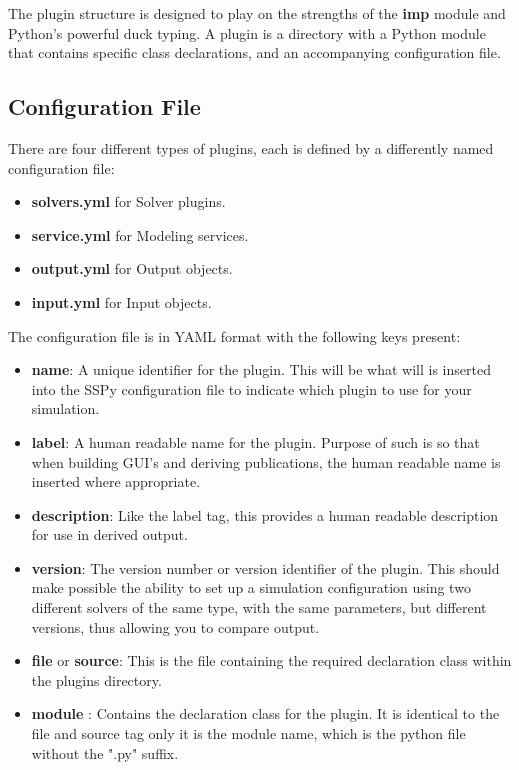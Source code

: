 \documentclass[12pt]{article}
\begin{document}
The plugin structure is designed to play on the strengths of the {\bf imp} module and Python's powerful duck typing. A plugin is a directory with a Python module that contains specific class declarations, and an accompanying configuration file. 

\subsection*{Configuration File}

There are four different types of plugins, each is defined by a differently named configuration file:

\begin{itemize}
	\item[] {\bf solvers.yml} for Solver plugins.
	\item[] {\bf service.yml} for Modeling services.
	\item[] {\bf output.yml} for Output objects.
	\item[] {\bf input.yml} for Input objects.
\end{itemize}

The configuration file is in YAML format with the following keys present:

\begin{itemize}
	\item[] {\bf name}: A unique identifier for the plugin. This will be what will is inserted into the SSPy configuration file to indicate which plugin to use for your simulation.
	\item[] {\bf label}: A human readable name for the plugin. Purpose of such is so that when building GUI's and deriving publications, the human readable name is inserted where appropriate. 
	\item[] {\bf description}: Like the label tag, this provides a human readable description for use in derived output.
	\item[] {\bf version}: The version number or version identifier of the plugin. This should make possible the ability to set up a simulation configuration using two different solvers of the same type, with the same parameters, but different versions, thus allowing you to compare output.
	\item[] {\bf file} or {\bf source}: This is the file containing the required declaration class within the plugins directory. 
	\item[] {\bf module} : Contains the declaration class for the plugin. It is identical to the file and source tag only it is the module name, which is the python file without the ".py" suffix.
\end{itemize}
\end{document}
